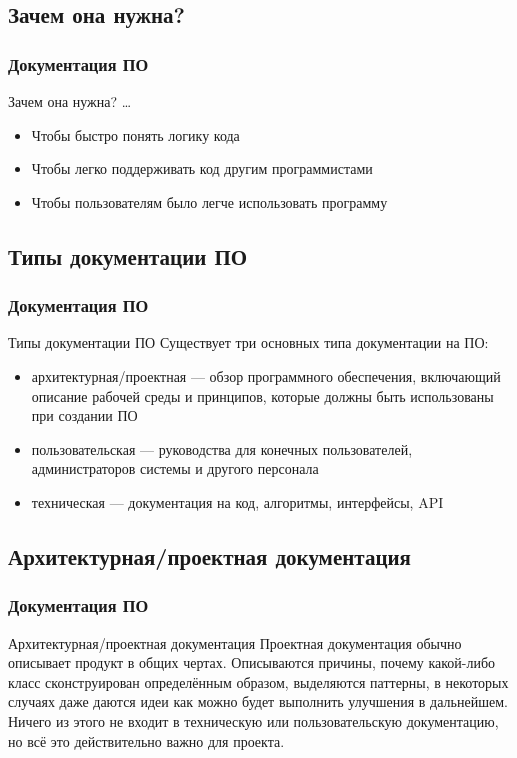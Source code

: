 \documentclass{industrial-development}
\begin{document}
\subsection{Зачем она нужна?}
\begin{frame} \frametitle{Документация ПО}
  \begin{block}{Зачем она нужна?}
\dots
  \end{block}
  
  \begin{itemize}
  \item Чтобы быстро понять логику кода
  \item Чтобы легко поддерживать код другим программистами
  \item Чтобы пользователям было легче использовать программу
  \end{itemize}
\end{frame}

\subsection{Типы документации ПО}
\begin{frame} \frametitle{Документация ПО}
  \begin{block}{Типы документации ПО}
Существует три основных типа документации на ПО: 
  \end{block}
  \begin{itemize}
  \item архитектурная/проектная — обзор программного обеспечения, включающий описание рабочей среды и принципов, которые должны быть использованы при создании ПО
  \item пользовательская — руководства для конечных пользователей, администраторов системы и другого персонала
  \item техническая — документация на код, алгоритмы, интерфейсы, API
  \end{itemize}
\end{frame}

\subsection{Архитектурная/проектная документация}
\begin{frame} \frametitle{Документация ПО}
  \begin{block}{Архитектурная/проектная документация}
 Проектная документация обычно описывает продукт в общих чертах. Описываются причины, почему какой-либо класс сконструирован определённым образом, выделяются паттерны, в некоторых случаях даже даются идеи как можно будет выполнить улучшения в дальнейшем. Ничего из этого не входит в техническую или пользовательскую документацию, но всё это действительно важно для проекта.
  \end{block}
\end{frame}
\end{document}
